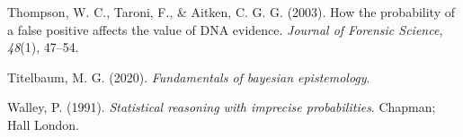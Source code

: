 \documentclass[
  10pt,
  dvipsnames,enabledeprecatedfontcommands]{scrartcl}
\newlength{\cslhangindent}
\newlength{\cslentryspacingunit} %
\newenvironment{CSLReferences}[2] %
 {%
  \setlength{\parindent}{0pt}
  \ifodd #1
  \let\oldpar\par
  \def\par{\hangindent=\cslhangindent\oldpar}
  \fi
  \setlength{\parskip}{#2\cslentryspacingunit}
 }%
 {}
\begin{document}
\begin{CSLReferences}{1}{0}
\leavevmode{}%
Thompson, W. C., Taroni, F., \& Aitken, C. G. G. (2003). How the
probability of a false positive affects the value of {DNA} evidence.
\emph{Journal of Forensic Science}, \emph{48}(1), 47--54.

\leavevmode{}%
Titelbaum, M. G. (2020). \emph{Fundamentals of bayesian epistemology}.

\leavevmode{}%
Walley, P. (1991). \emph{Statistical reasoning with imprecise
probabilities}. Chapman; Hall London.

\end{CSLReferences}
\end{document}

